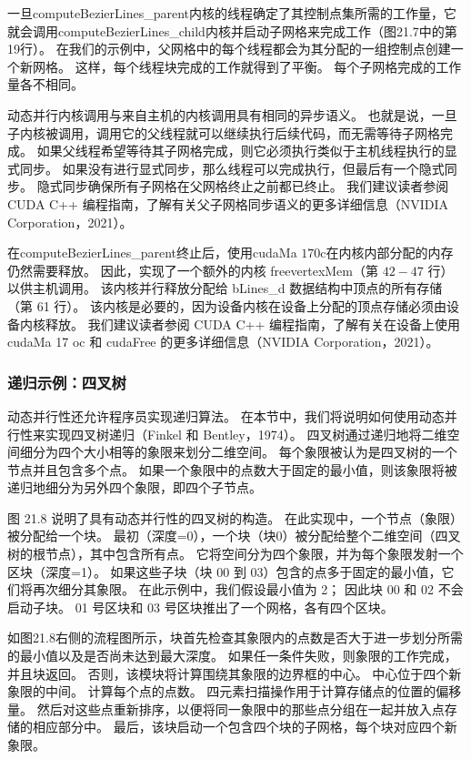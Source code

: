 一旦computeBezierLines\_parent内核的线程确定了其控制点集所需的工作量，它就会调用computeBezierLines\_child内核并启动子网格来完成工作（图21.7中的第19行）。 在我们的示例中，父网格中的每个线程都会为其分配的一组控制点创建一个新网格。 这样，每个线程块完成的工作就得到了平衡。 每个子网格完成的工作量各不相同。

动态并行内核调用与来自主机的内核调用具有相同的异步语义。 也就是说，一旦子内核被调用，调用它的父线程就可以继续执行后续代码，而无需等待子网格完成。 如果父线程希望等待其子网格完成，则它必须执行类似于主机线程执行的显式同步。 如果没有进行显式同步，那么线程可以完成执行，但最后有一个隐式同步。 隐式同步确保所有子网格在父网格终止之前都已终止。 我们建议读者参阅 CUDA C++ 编程指南，了解有关父子网格同步语义的更多详细信息（NVIDIA Corporation，2021）。

在computeBezierLines\_parent终止后，使用cudaMa $170 \mathrm{c}$在内核内部分配的内存仍然需要释放。 因此，实现了一个额外的内核 freevertexMem（第 $42-47$ 行）以供主机调用。 该内核并行释放分配给 bLines\_d 数据结构中顶点的所有存储（第 61 行）。 该内核是必要的，因为设备内核在设备上分配的顶点存储必须由设备内核释放。 我们建议读者参阅 CUDA C++ 编程指南，了解有关在设备上使用 cudaMa 17 oc 和 cudaFree 的更多详细信息（NVIDIA Corporation，2021）。

\subsubsection{递归示例：四叉树}
动态并行性还允许程序员实现递归算法。 在本节中，我们将说明如何使用动态并行性来实现四叉树递归（Finkel 和 Bentley，1974）。 四叉树通过递归地将二维空间细分为四个大小相等的象限来划分二维空间。 每个象限被认为是四叉树的一个节点并且包含多个点。 如果一个象限中的点数大于固定的最小值，则该象限将被递归地细分为另外四个象限，即四个子节点。

图 21.8 说明了具有动态并行性的四叉树的构造。 在此实现中，一个节点（象限）被分配给一个块。 最初（深度=0），一个块（块0）被分配给整个二维空间（四叉树的根节点），其中包含所有点。 它将空间分为四个象限，并为每个象限发射一个区块（深度=1）。 如果这些子块（块 00 到 03）包含的点多于固定的最小值，它们将再次细分其象限。 在此示例中，我们假设最小值为 2； 因此块 00 和 02 不会启动子块。 01 号区块和 03 号区块推出了一个网格，各有四个区块。

如图21.8右侧的流程图所示，块首先检查其象限内的点数是否大于进一步划分所需的最小值以及是否尚未达到最大深度。 如果任一条件失败，则象限的工作完成，并且块返回。 否则，该模块将计算围绕其象限的边界框的中心。 中心位于四个新象限的中间。 计算每个点的点数。 四元素扫描操作用于计算存储点的位置的偏移量。 然后对这些点重新排序，以便将同一象限中的那些点分组在一起并放入点存储的相应部分中。 最后，该块启动一个包含四个块的子网格，每个块对应四个新象限。

